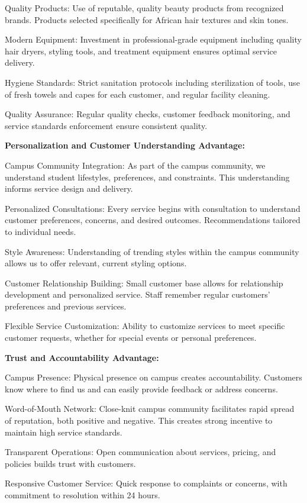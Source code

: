 \documentclass[a4paper,12pt]{article}
\begin{document}
Quality Products: Use of reputable, quality beauty products from recognized brands. Products selected specifically for African hair textures and skin tones.

Modern Equipment: Investment in professional-grade equipment including quality hair dryers, styling tools, and treatment equipment ensures optimal service delivery.

Hygiene Standards: Strict sanitation protocols including sterilization of tools, use of fresh towels and capes for each customer, and regular facility cleaning.

Quality Assurance: Regular quality checks, customer feedback monitoring, and service standards enforcement ensure consistent quality.

\textbf{Personalization and Customer Understanding Advantage:}

Campus Community Integration: As part of the campus community, we understand student lifestyles, preferences, and constraints. This understanding informs service design and delivery.

Personalized Consultations: Every service begins with consultation to understand customer preferences, concerns, and desired outcomes. Recommendations tailored to individual needs.

Style Awareness: Understanding of trending styles within the campus community allows us to offer relevant, current styling options.

Customer Relationship Building: Small customer base allows for relationship development and personalized service. Staff remember regular customers' preferences and previous services.

Flexible Service Customization: Ability to customize services to meet specific customer requests, whether for special events or personal preferences.

\textbf{Trust and Accountability Advantage:}

Campus Presence: Physical presence on campus creates accountability. Customers know where to find us and can easily provide feedback or address concerns.

Word-of-Mouth Network: Close-knit campus community facilitates rapid spread of reputation, both positive and negative. This creates strong incentive to maintain high service standards.

Transparent Operations: Open communication about services, pricing, and policies builds trust with customers.

Responsive Customer Service: Quick response to complaints or concerns, with commitment to resolution within 24 hours.
\end{document}
